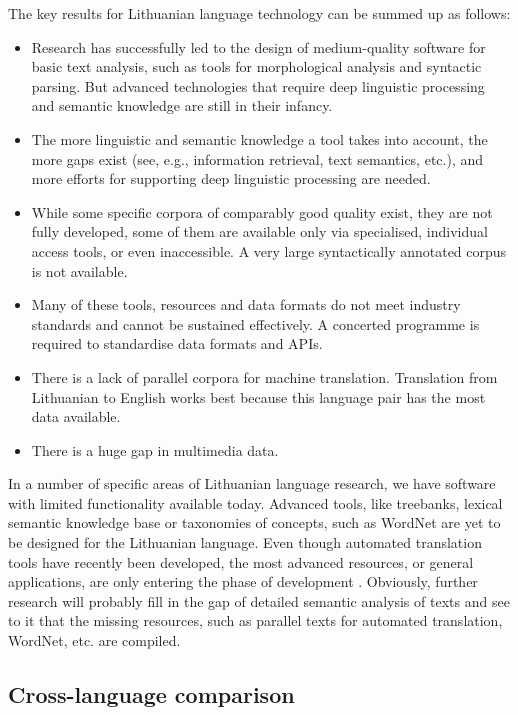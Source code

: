 \documentclass[]{../metanetpaper}
\begin{document}
\begin{multicols}{2}
The key results for Lithuanian language technology can be summed up as follows:

\begin{itemize}
\item Research has successfully led to the design of medium-quality software for basic text analysis, such as tools for morphological analysis and syntactic parsing. But advanced technologies that require deep linguistic processing and semantic knowledge are still in their infancy. 
\item The more linguistic and semantic knowledge a tool takes into account, the more gaps exist (see, e.g., information retrieval, text semantics, etc.), and more efforts for supporting deep linguistic processing are needed. 
\item While some specific corpora of comparably good quality exist, they are not fully developed, some of them are available only via specialised, individual access tools, or even inaccessible. A very large syntactically annotated corpus is not available. 
\item Many of these tools, resources and data formats do not meet industry standards and cannot be sustained effectively. A concerted programme is required to standardise data formats and APIs. 
\item There is a lack of parallel corpora for machine translation. Translation from Lithuanian to English works best because this language pair has the most data available.
\item There is a huge gap in multimedia data.
\end{itemize}

In a number of specific areas of Lithuanian language research, we have software with limited functionality available today.  Advanced tools, like treebanks, lexical semantic knowledge base or taxonomies of concepts, such as WordNet are yet to be designed for the Lithuanian language. Even though automated translation tools have recently been developed, the most advanced resources, or general applications, are only entering the phase of development  \cite{td1}. Obviously, further research will probably fill in the gap of detailed semantic analysis of texts and see to it that the missing resources, such as parallel texts for automated translation, WordNet, etc. are compiled.

\subsection{Cross-language comparison}


\end{multicols}
\end{document}
